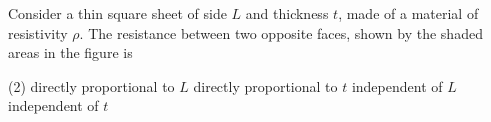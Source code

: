 
\item Consider a thin square sheet of side \( L \) and thickness \( t \), made of a material of resistivity \( \rho \). The resistance between two opposite faces, shown by the shaded areas in the figure is
    \begin{center}
    \end{center}
    \begin{tasks}(2)
        \task directly proportional to \( L \)
        \task directly proportional to \( t \)
        \task independent of \( L \)
        \task independent of \( t \)
    \end{tasks}
